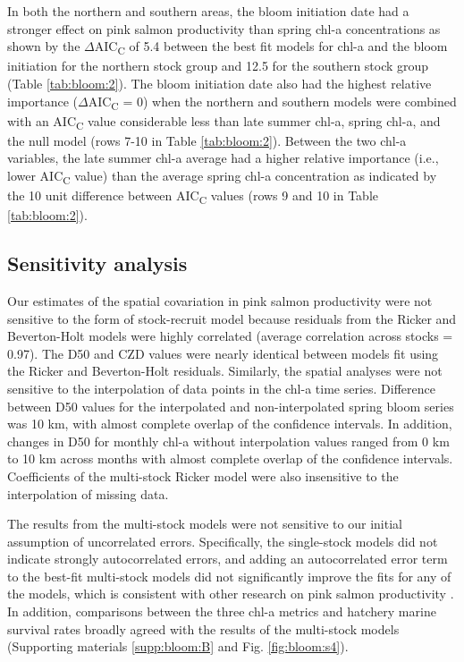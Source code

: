 In both the northern and southern areas, the bloom initiation date had a
stronger effect on pink salmon productivity than spring chl-a concentrations as
shown by the \(\Delta\)AIC\textsubscript{C} of 5.4 between the best fit models
for chl-a and the bloom initiation for the northern stock group and 12.5 for the
southern stock group (Table \ref{tab:bloom:2}).  The bloom initiation date also
had the highest relative importance (\(\Delta\)AIC\textsubscript{C} = 0) when
the northern and southern models were combined with an AIC\textsubscript{C}
value considerable less than late summer chl-a, spring chl-a, and the null model
(rows 7-10 in Table \ref{tab:bloom:2}). Between the two chl-a variables, the
late summer chl-a average had a higher relative importance (i.e., lower
AIC\textsubscript{C} value) than the average spring chl-a concentration as
indicated by the 10 unit difference between AIC\textsubscript{C} values (rows 9
and 10 in Table \ref{tab:bloom:2}).


\subsection{Sensitivity analysis}

Our estimates of the spatial covariation in pink salmon productivity were not
sensitive to the form of stock-recruit model because residuals from the Ricker
and Beverton-Holt models were highly correlated (average correlation across
stocks = 0.97). The D50 and CZD values were nearly identical between models fit
using the Ricker and Beverton-Holt residuals. Similarly, the spatial analyses
were not sensitive to the interpolation of data points in the chl-a time series.
Difference between D50 values for the interpolated and non-interpolated spring
bloom series was 10 km, with almost complete overlap of the confidence
intervals. In addition, changes in D50 for monthly chl-a without interpolation
values ranged from 0 km to 10 km across months with almost complete overlap of
the confidence intervals. Coefficients of the multi-stock Ricker model were also
insensitive to the interpolation of missing data.

The results from the multi-stock models were not sensitive to our initial
assumption of uncorrelated errors. Specifically, the single-stock models did not
indicate strongly autocorrelated errors, and adding an autocorrelated error term
to the best-fit multi-stock models did not significantly improve the fits for
any of the models, which is consistent with other research on pink salmon
productivity \citep{Pyper2001a}. In addition, comparisons between the three
chl-a metrics and hatchery marine survival rates broadly agreed with the results
of the multi-stock models (Supporting materials \ref{supp:bloom:B} and Fig.
\ref{fig:bloom:s4}).



